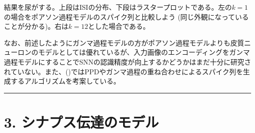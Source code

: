 \documentclass[letterpaper,10pt,english]{sphinxmanual}
\begin{document}
結果を尿がする。上段はISIの分布、下段はラスタープロットである。左の\(k=1\)の場合をポアソン過程モデルのスパイク列と比較しよう (同じ外観になっていることが分かる)。右は\(k=12\)とした場合である。

\begin{sphinxVerbatim}[commandchars=\\\{\}]
    
    
  
  
   
        \PYG{p}{[} \PYG{p}{]} \PYG{p}{[} \PYG{p}{]}     
\end{sphinxVerbatim}

なお、前述したようにガンマ過程モデルの方がポアソン過程モデルよりも皮質ニューロンのモデルとしては優れているが、入力画像のエンコーディングをガンマ過程モデルにすることでSNNの認識精度が向上するかどうかはまだ十分に研究されていない。また、()ではPPDやガンマ過程の重ね合わせによるスパイク列を生成するアルゴリズムを考案している。


\bigskip\hrule\bigskip



\section{3. シナプス伝達のモデル}
\label{\detokenize{3_intro:id1}}\label{\detokenize{3_intro::doc}}
\end{document}
